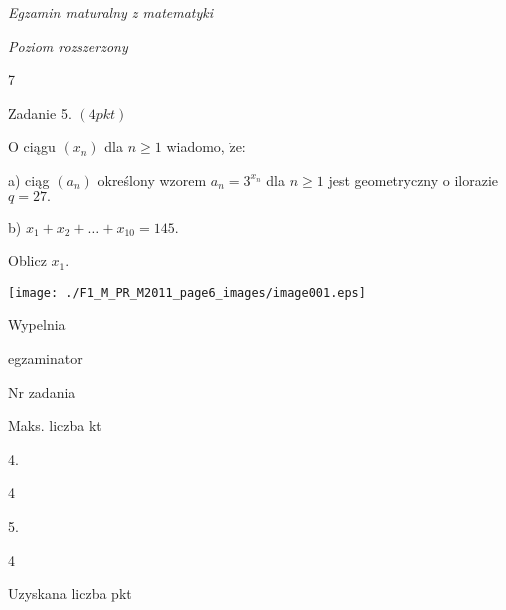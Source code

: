 \documentclass[a4paper,12pt]{article}
\begin{document}
{\it Egzamin maturalny z matematyki}

{\it Poziom rozszerzony}

7

Zadanie 5. $(4pkt)$

$\mathrm{O}$ ciągu $(x_{n})$ dla $n\geq 1$ wiadomo, $\dot{\mathrm{z}}\mathrm{e}$:

a) ciąg $(a_{n})$ określony wzorem $a_{n}=3^{x_{n}}$ dla $n\geq 1$ jest geometryczny o ilorazie $q=27.$

b) $x_{1}+x_{2}+\ldots+x_{10}=145.$

Oblicz $x_{1}.$
\begin{center}
\texttt{[image: ./F1\_M\_PR\_M2011\_page6\_images/image001.eps]}
\end{center}
Wypelnia

egzaminator

Nr zadania

Maks. liczba kt

4.

4

5.

4

Uzyskana liczba pkt
\end{document}
